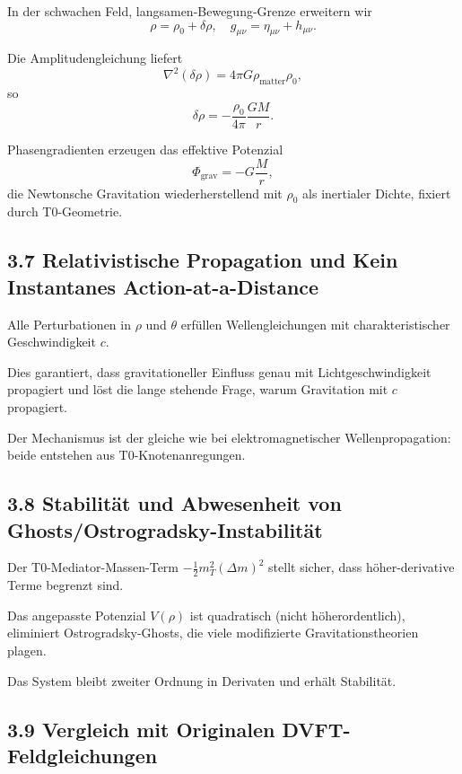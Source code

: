 \documentclass[12pt,a4paper]{article}
\begin{document}
	In der schwachen Feld, langsamen-Bewegung-Grenze erweitern wir
	\[
	\rho = \rho_0 + \delta \rho, \quad g_{\mu\nu} = \eta_{\mu\nu} + h_{\mu\nu}.
	\]
	
	Die Amplitudengleichung liefert
	\[
	\nabla^2 (\delta \rho) = 4\pi G \rho_{\text{matter}} \rho_0,
	\]
	so
	\[
	\delta \rho = -\frac{\rho_0}{4\pi} \frac{GM}{r}.
	\]
	
	Phasengradienten erzeugen das effektive Potenzial
	\[
	\Phi_{\text{grav}} = -G \frac{M}{r},
	\]
	die Newtonsche Gravitation wiederherstellend mit $\rho_0$ als inertialer Dichte, fixiert durch T0-Geometrie.
	
	\subsection{3.7 Relativistische Propagation und Kein Instantanes Action-at-a-Distance}
	
	Alle Perturbationen in $\rho$ und $\theta$ erfüllen Wellengleichungen mit charakteristischer Geschwindigkeit $c$.
	
	Dies garantiert, dass gravitationeller Einfluss genau mit Lichtgeschwindigkeit propagiert und löst die lange stehende Frage, warum Gravitation mit $c$ propagiert.
	
	Der Mechanismus ist der gleiche wie bei elektromagnetischer Wellenpropagation: beide entstehen aus T0-Knotenanregungen.
	
	\subsection{3.8 Stabilität und Abwesenheit von Ghosts/Ostrogradsky-Instabilität}
	
	Der T0-Mediator-Massen-Term $-\frac{1}{2} m_T^2 (\Delta m)^2$ stellt sicher, dass höher-derivative Terme begrenzt sind.
	
	Das angepasste Potenzial $V(\rho)$ ist quadratisch (nicht höherordentlich), eliminiert Ostrogradsky-Ghosts, die viele modifizierte Gravitationstheorien plagen.
	
	Das System bleibt zweiter Ordnung in Derivaten und erhält Stabilität.
	
	\subsection{3.9 Vergleich mit Originalen DVFT-Feldgleichungen}
	
\end{document}
